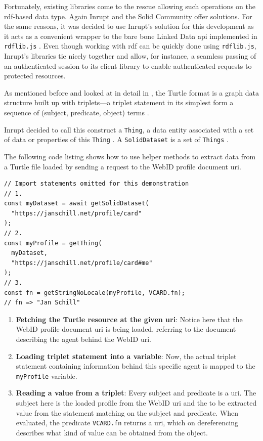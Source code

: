 Fortunately, existing libraries come to the rescue allowing such operations on the \gls{rdf}-based data type. Again Inrupt and the Solid Community offer solutions. For the same reasons, it was decided to use Inrupt's solution for this development as it acts as a convenient wrapper to the bare bone Linked Data \gls{api} implemented in \texttt{rdflib.js} \cite{rdflib-js}. Even though working with \gls{rdf} can be quickly done using \texttt{rdflib.js}, Inrupt's libraries tie nicely together and allow, for instance, a seamless passing of an authenticated session to its client library to enable authenticated requests to protected resources.

As mentioned before and looked at in detail in \cite{cern-solid-investigation-spec}, the Turtle format is a graph data structure built up with triplets---a triplet statement in its simplest form a sequence of (subject, predicate, object) terms \cite{Prud:hommeaux:14:RT}. 

Inrupt decided to call this construct a \texttt{Thing}, a data entity associated with a set of data or properties of this \texttt{Thing} \cite{inrupt-thing}. A \texttt{SolidDataset} is a set of \texttt{Things} \cite{inrupt-dataset}.

The following code listing shows how to use helper methods to extract data from a Turtle file loaded by sending a request to the WebID profile document \gls{uri}.
\newpage
\begin{lstlisting}[language=Other,columns=fullflexible, caption={Basic usage of Inrupt's solid-client library.}, label={lst:2}]
// Import statements omitted for this demonstration
// 1.
const myDataset = await getSolidDataset(
  "https://janschill.net/profile/card"
);
// 2.
const myProfile = getThing(
  myDataset,
  "https://janschill.net/profile/card#me"
);
// 3.
const fn = getStringNoLocale(myProfile, VCARD.fn);
// fn => "Jan Schill"
\end{lstlisting}

\begin{enumerate}
    \item \textbf{Fetching the Turtle resource at the given \gls{uri}}: Notice here that the WebID profile document \gls{uri} is being loaded, referring to the document describing the agent behind the WebID \gls{uri}.
    \item \textbf{Loading triplet statement into a variable}: Now, the actual triplet statement containing information behind this specific agent is mapped to the \texttt{myProfile} variable.
    \item \textbf{Reading a value from a triplet}: Every subject and predicate is a \gls{uri}. The subject here is the loaded profile from the WebID \gls{uri} and the to be extracted value from the statement matching on the subject and predicate. When evaluated, the predicate \texttt{VCARD.fn} returns a \gls{uri}, which on dereferencing describes what kind of value can be obtained from the object.
\end{enumerate}

